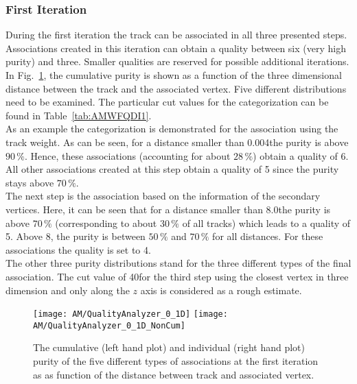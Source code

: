 

\subsubsection{First Iteration}
During the first iteration the track can be associated in all three presented steps. Associations created in this iteration can obtain a quality between six (very high purity) and three. Smaller qualities are reserved for possible additional iterations. In Fig.~\ref{plot:AMWFQualityI1}, the cumulative purity is shown as a function of the three dimensional distance between the track and the associated vertex. Five different distributions need to be examined. The particular cut values for the categorization can be found in Table~\ref{tab:AMWFQDI1}. \\
As an example the categorization is demonstrated for the association using the track weight. As can be seen, for a distance smaller than 0.004\cm the purity is above $90\,\%$. Hence, these associations (accounting for about $28\,\%$) obtain a quality of 6. All other associations created at this step obtain a quality of 5 since the purity stays above $70\,\%$. \\
The next step is the association based on the information of the secondary vertices. Here, it can be seen that for a distance smaller than 8.0\cm the purity is above $70\,\%$ (corresponding to about $30\,\%$ of all tracks) which leads to a quality of 5. Above 8\cm{}, the purity is between $50\,\%$ and $70\,\%$ for all distances. For these associations the quality is set to 4. \\
The other three purity distributions stand for the three different types of the final association. The cut value of 40\cm for the third step using the closest vertex in three dimension and only along the $z$ axis is considered as a rough estimate.

\begin{figure}[!ht]
    \centering
    \texttt{[image: AM/QualityAnalyzer\_0\_1D]}
    \texttt{[image: AM/QualityAnalyzer\_0\_1D\_NonCum]}
    \caption[Cumulative and normal purity of iteration one vs distance to define quality]{The cumulative (left hand plot) and individual (right hand plot) purity of the five different types of associations at the first iteration as as function of the distance between track and associated vertex.\label{plot:AMWFQualityI1}}
\end{figure}

